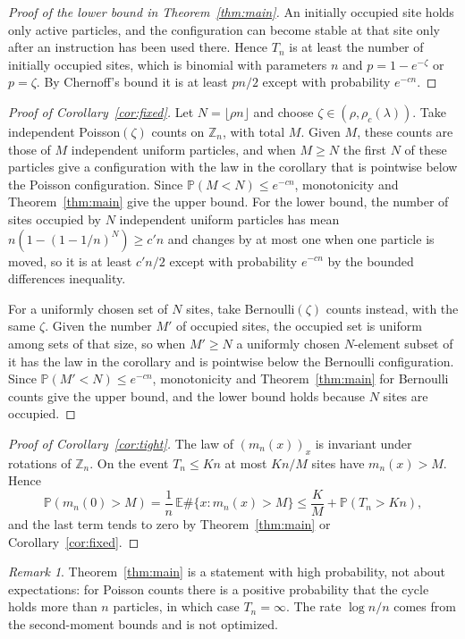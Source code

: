 \documentclass[11pt]{amsart}
\theoremstyle{remark}
\newtheorem{remark}[theorem]{Remark}
\newcommand{\Z}{\mathbb Z}
\newcommand{\E}{\mathbb E}
\renewcommand{\Pr}{\mathbb P}
\begin{document}
\begin{proof}[Proof of the lower bound in Theorem~\ref{thm:main}]
An initially occupied site holds only active particles, and the configuration can become stable at that site only after
an instruction has been used there. Hence $T_n$ is at least the number of initially occupied sites, which is binomial with
parameters $n$ and $p=1-e^{-\zeta}$ or $p=\zeta$. By Chernoff's bound it is at least $pn/2$ except with probability
$e^{-c n}$.
\end{proof}

\begin{proof}[Proof of Corollary~\ref{cor:fixed}]
Let $N=\lfloor\rho n\rfloor$ and choose $\zeta\in(\rho,\rho_c(\lambda))$. Take independent Poisson$(\zeta)$ counts on
$\Z_n$, with total $M$. Given $M$, these counts are those of $M$ independent uniform particles, and when $M\ge N$ the
first $N$ of these particles give a configuration with the law in the corollary that is pointwise below the Poisson
configuration. Since $\Pr(M<N)\le e^{-cn}$, monotonicity and Theorem~\ref{thm:main} give the upper bound. For the lower
bound, the number of sites occupied by $N$ independent uniform particles has mean $n(1-(1-1/n)^N)\ge c'n$ and changes by at
most one when one particle is moved, so it is at least $c'n/2$ except with probability $e^{-cn}$ by the bounded
differences inequality.

For a uniformly chosen set of $N$ sites, take Bernoulli$(\zeta)$ counts instead, with the same $\zeta$. Given the number
$M'$ of occupied sites, the occupied set is uniform among sets of that size, so when $M'\ge N$ a uniformly chosen
$N$-element subset of it has the law in the corollary and is pointwise below the Bernoulli configuration. Since
$\Pr(M'<N)\le e^{-cn}$, monotonicity and Theorem~\ref{thm:main} for Bernoulli counts give the upper bound, and the lower
bound holds because $N$ sites are occupied.
\end{proof}

\begin{proof}[Proof of Corollary~\ref{cor:tight}]
The law of $(m_n(x))_x$ is invariant under rotations of $\Z_n$. On the event $T_n\le Kn$ at most $Kn/M$ sites have
$m_n(x)>M$. Hence
\[
\Pr(m_n(0)>M)=\frac1n\,\E\#\{x:m_n(x)>M\}\le\frac KM+\Pr(T_n>Kn),
\]
and the last term tends to zero by Theorem~\ref{thm:main} or Corollary~\ref{cor:fixed}.
\end{proof}

\begin{remark}
Theorem~\ref{thm:main} is a statement with high probability, not about expectations: for Poisson counts there is a
positive probability that the cycle holds more than $n$ particles, in which case $T_n=\infty$. The rate $\log n/n$ comes
from the second-moment bounds and is not optimized.
\end{remark}
\end{document}
